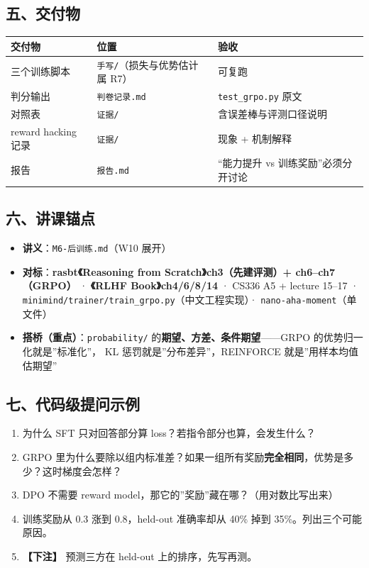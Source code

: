 \documentclass[
  chinese,
  11pt,
]{ctexart}
\newcounter{none} %
\providecommand{\tightlist}{%
  \setlength{\itemsep}{0pt}\setlength{\parskip}{0pt}}
\begin{document}
\subsection{五、交付物}\label{ux4e94ux4ea4ux4ed8ux7269}

{\def\LTcaptype{none} %
\begin{longtable}[]{@{}lll@{}}
\toprule\noalign{}
交付物 & 位置 & 验收 \\
\midrule\noalign{}
\endhead
\bottomrule\noalign{}
\endlastfoot
三个训练脚本 & \texttt{手写/}（损失与优势估计属 R7） & 可复跑 \\
判分输出 & \texttt{判卷记录.md} & \texttt{test\_grpo.py} 原文 \\
对照表 & \texttt{证据/} & 含误差棒与评测口径说明 \\
reward hacking 记录 & \texttt{证据/} & 现象 + 机制解释 \\
报告 & \texttt{报告.md} & ``能力提升 vs 训练奖励''必须分开讨论 \\
\end{longtable}
}

\subsection{六、讲课锚点}\label{ux516dux8bb2ux8bfeux951aux70b9}

\begin{itemize}
\tightlist
\item
  \textbf{讲义}：\texttt{M6-后训练.md}（W10 展开）
\item
  \textbf{对标}：\textbf{rasbt《Reasoning from Scratch》ch3（先建评测）+ ch6--ch7（GRPO）} · \textbf{《RLHF Book》ch4/6/8/14} · CS336 A5 + lecture 15--17 · \texttt{minimind/trainer/train\_grpo.py}（中文工程实现）· \texttt{nano-aha-moment}（单文件）
\item
  \textbf{搭桥（重点）}：\texttt{probability/} 的\textbf{期望、方差、条件期望}------GRPO 的优势归一化就是''标准化''， KL 惩罚就是''分布差异''，REINFORCE 就是''用样本均值估期望''
\end{itemize}

\subsection{七、代码级提问示例}\label{ux4e03ux4ee3ux7801ux7ea7ux63d0ux95eeux793aux4f8b}

\begin{enumerate}
\def\labelenumi{\arabic{enumi}.}
\tightlist
\item
  为什么 SFT 只对回答部分算 loss？若指令部分也算，会发生什么？
\item
  GRPO 里为什么要除以组内标准差？如果一组所有奖励\textbf{完全相同}，优势是多少？这时梯度会怎样？
\item
  DPO 不需要 reward model，那它的''奖励''藏在哪？（用对数比写出来）
\item
  训练奖励从 0.3 涨到 0.8，held-out 准确率却从 40\% 掉到 35\%。列出三个可能原因。
\item
  \textbf{【下注】} 预测三方在 held-out 上的排序，先写再测。
\end{enumerate}
\end{document}

